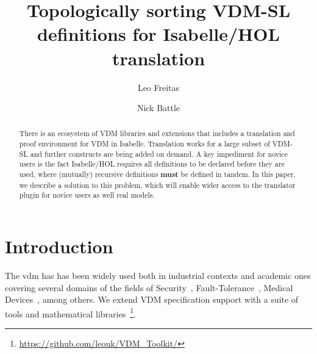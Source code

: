 \documentclass[runningheads,a4paper]{llncs}
\begin{document}
%



\title{Topologically sorting VDM-SL definitions for Isabelle/HOL translation}

\author{Leo Freitas \and Nick Battle
}
\authorrunning{ }

			
\maketitle
\setcounter{footnote}{0} 
\begin{abstract}
    There is an ecosystem of VDM libraries and extensions that includes a translation and proof environment for VDM in Isabelle. Translation works for a large subset of VDM-SL and further constructs are being added on demand. A key impediment for novice users is the fact Isabelle/HOL requires all definitions to be declared before they are used, where (mutually) recursive definitions \textbf{must} be defined in tandem. In this paper, we describe a solution to this problem, which will enable wider access to the translator plugin for novice users as well real models.   
\end{abstract}


\section{Introduction}\label{sec:intro}

The \gls{vdm} has has been widely used both in industrial contexts and academic ones covering several domains of the fields of Security~\cite{Kulik&20,Kulik&21a}, Fault-Tolerance~\cite{Nilsson&18}, Medical Devices~\cite{Macedo&08}, among others. We extend VDM specification support with a suite of tools and mathematical libraries~\footnote{\url{https://github.com/leouk/VDM_Toolkit/}}. 
\end{document}
